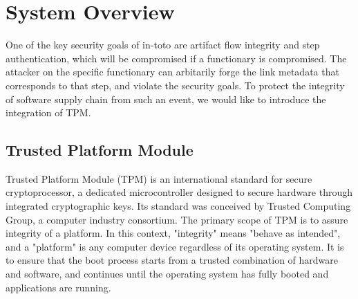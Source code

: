 \section{System Overview}
One of the key security goals of in-toto are artifact flow integrity and step authentication, which will be compromised if a functionary is compromised. The attacker on the specific functionary can arbitarily forge the link metadata that corresponds to that step, and violate the security goals. To protect the integrity of software supply chain from such an event, we would like to introduce the integration of TPM.

\subsection{Trusted Platform Module}
Trusted Platform Module (TPM) is an international standard for secure cryptoprocessor, a dedicated microcontroller designed to secure hardware through integrated cryptographic keys. Its standard was conceived by Trusted Computing Group, a computer industry consortium. The primary scope of TPM is to assure integrity of a platform. In this context, "integrity" means "behave as intended", and a "platform" is any computer device regardless of its operating system. It is to ensure that the boot process starts from a trusted combination of hardware and software, and continues until the operating system has fully booted and applications are running.
